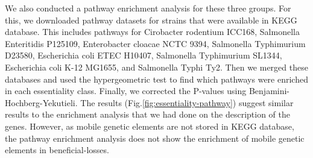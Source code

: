 \documentclass[12pt,letterpaper]{article}
\begin{document}
We also conducted a pathway enrichment analysis for these three groups. For this, we downloaded pathway datasets for strains that were available in KEGG database. This includes pathways for Cirobacter rodentium ICC168, Salmonella Enteritidis P125109, Enterobacter cloacae NCTC 9394, Salmonella Typhimurium D23580, Escherichia coli ETEC H10407, Salmonella Typhimurium SL1344, Escherichia coli K-12 MG1655, and Salmonella Typhi Ty2. Then we merged these databases and used the hypergeometric test to find which pathways were enriched in each essentiality class. Finally, we corrected the P-values using Benjamini-Hochberg-Yekutieli. The results (Fig.\@ \ref{fig:essentiality-pathway}) suggest similar results to the enrichment analysis that we had done on the description of the genes. However, as mobile genetic elements are not stored in KEGG database, the pathway enrichment analysis does not show the enrichment of mobile genetic elements in beneficial-losses.
\end{document}
